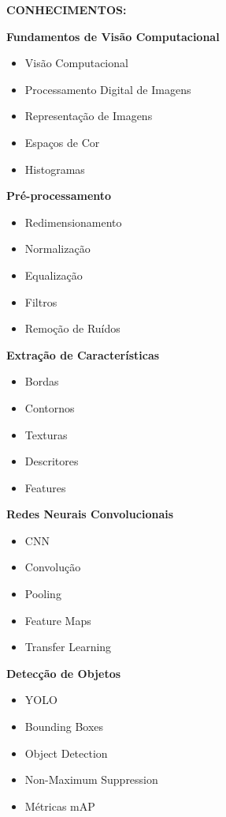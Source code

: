 \textbf{CONHECIMENTOS:}

\textbf{Fundamentos de Visão Computacional}

\begin{itemize}
\item Visão Computacional
\item Processamento Digital de Imagens
\item Representação de Imagens
\item Espaços de Cor
\item Histogramas
\end{itemize}

\textbf{Pré-processamento}

\begin{itemize}
\item Redimensionamento
\item Normalização
\item Equalização
\item Filtros
\item Remoção de Ruídos
\end{itemize}

\textbf{Extração de Características}

\begin{itemize}
\item Bordas
\item Contornos
\item Texturas
\item Descritores
\item Features
\end{itemize}

\textbf{Redes Neurais Convolucionais}

\begin{itemize}
\item CNN
\item Convolução
\item Pooling
\item Feature Maps
\item Transfer Learning
\end{itemize}

\textbf{Detecção de Objetos}

\begin{itemize}
\item YOLO
\item Bounding Boxes
\item Object Detection
\item Non-Maximum Suppression
\item Métricas mAP
\end{itemize}

